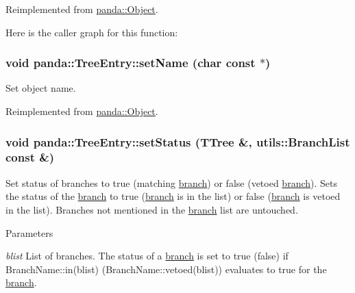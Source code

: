 Reimplemented from \hyperlink{classpanda_1_1Object_aed9f9d3b6abe518dd27957de843b36b5}{panda::Object}.

Here is the caller graph for this function:\hypertarget{classpanda_1_1TreeEntry_aa0f473dd6eca2ae68ef9b9cb37d909bb}{
\subsubsection[{setName}]{\setlength{\rightskip}{0pt plus 5cm}void panda::TreeEntry::setName (char const $\ast$)}}
\label{classpanda_1_1TreeEntry_aa0f473dd6eca2ae68ef9b9cb37d909bb}


Set object name. 

Reimplemented from \hyperlink{classpanda_1_1Object_a7bba3813f78065be847cd8d85bab93fc}{panda::Object}.\hypertarget{classpanda_1_1TreeEntry_a8d65c0ee41e1ef5c7f7a41c454dad052}{
\subsubsection[{setStatus}]{\setlength{\rightskip}{0pt plus 5cm}void panda::TreeEntry::setStatus (TTree \&, \/  {\bf utils::BranchList} const \&)}}
\label{classpanda_1_1TreeEntry_a8d65c0ee41e1ef5c7f7a41c454dad052}


Set status of branches to true (matching \hyperlink{namespacepanda_1_1branch}{branch}) or false (vetoed \hyperlink{namespacepanda_1_1branch}{branch}). Sets the status of the \hyperlink{namespacepanda_1_1branch}{branch} to true (\hyperlink{namespacepanda_1_1branch}{branch} is in the list) or false (\hyperlink{namespacepanda_1_1branch}{branch} is vetoed in the list). Branches not mentioned in the \hyperlink{namespacepanda_1_1branch}{branch} list are untouched.


\begin{DoxyParams}{Parameters}
\item[{\em blist}]List of branches. The status of a \hyperlink{namespacepanda_1_1branch}{branch} is set to true (false) if BranchName::in(blist) (BranchName::vetoed(blist)) evaluates to true for the \hyperlink{namespacepanda_1_1branch}{branch}. \end{DoxyParams}


